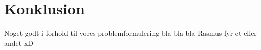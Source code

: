 \chapter{Konklusion}
Noget godt i forhold til vores problemformulering bla bla bla Rasmus fyr et eller andet xD
